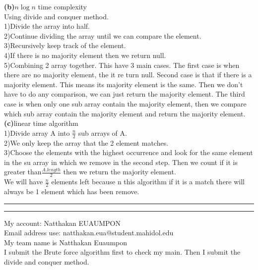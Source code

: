 \documentclass[a4paper, 11pt]{article}
\newcommand{\question}[2] {\vspace{.25in} \hrule\vspace{0.5em}
\noindent{\bf #1: #2} \vspace{0.5em}
\hrule \vspace{.10in}}
\renewcommand{\part}[1] {\vspace{.10in} {\bf (#1)}}
\begin{document}
\part{b}{$n\log n$ time complexity}\\
Using divide and conquer method.\\
1)Divide the array into half.\\
2)Continue dividing the array until we can compare the element.\\
3)Recursively keep track of the element.\\
4)If there is no majority element then we return null.\\
5)Combining 2 array together. This have 3 main cases. The first case is when there are no majority element, the it re turn null. Second case is that if there is a majority element.  This means its majority element is the same. Then we don't have to do any comparison, we can just return the majority element. The third case is when only one sub array contain the majority element, then we compare which sub array contain the majority element and return the majority element.\\

\part{c}{linear time algorithm}\\
1)Divide array A into $\frac{n}{2}$ sub arrays of A.\\
2)We only keep the array that the 2 element matches.\\
3)Choose the elements with the highest occurrence and look for the same element in the su array in which we remove in the second step. Then we count if it is greater than$\frac{A.length}{2}$ then we return the majority element.\\
We will have $\frac{n}{2}$ elements left because n this algorithm if it is a match there will always be 1 element which has been remove.
\question{5}{Problem 5}
My account: Natthakan EUAUMPON\\
Email address use: natthakan.eua@student.mahidol.edu\\
My team name is Natthakan Euaumpon\\
I submit the Brute force algorithm first to check my main. Then I submit the divide and conquer method.
\end{document}

